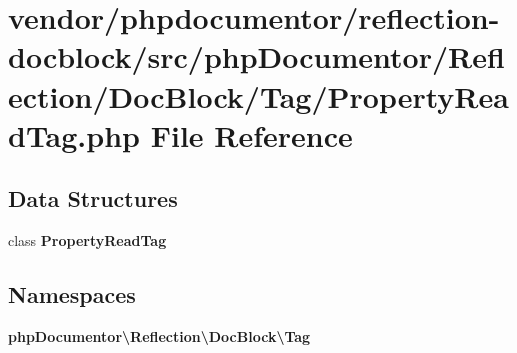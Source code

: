 \section{vendor/phpdocumentor/reflection-\/docblock/src/php\+Documentor/\+Reflection/\+Doc\+Block/\+Tag/\+Property\+Read\+Tag.php File Reference}
\label{_property_read_tag_8php}
\subsection*{Data Structures}
\begin{DoxyCompactItemize}
\item 
class {\bf Property\+Read\+Tag}
\end{DoxyCompactItemize}
\subsection*{Namespaces}
\begin{DoxyCompactItemize}
\item 
 {\bf php\+Documentor\textbackslash{}\+Reflection\textbackslash{}\+Doc\+Block\textbackslash{}\+Tag}
\end{DoxyCompactItemize}
